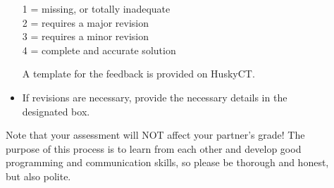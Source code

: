 \documentclass[twocolumn]{article}
\begin{document}
\begin{description}
\begin{itemize}
1 = missing, or totally inadequate\\
2 = requires a major revision\\
3 = requires a minor revision\\
4 = complete and accurate solution

A template for the feedback is provided on HuskyCT.

\item
  If revisions are necessary, provide the necessary details in the
designated box.
\end{itemize}

Note that your assessment will NOT affect your partner's grade! The
purpose of this process is to learn from each other and develop good
programming and communication skills, so please be thorough and
honest, but also polite.


\end{description}
\end{document}
